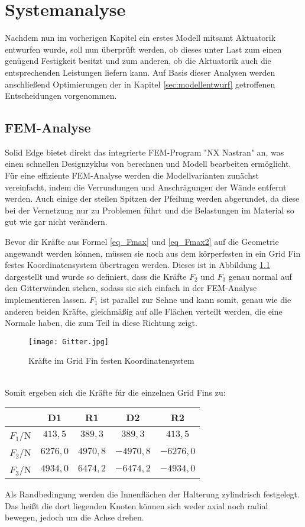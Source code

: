 \chapter{Systemanalyse}\label{sec:simulation}
Nachdem nun im vorherigen Kapitel ein erstes Modell mitsamt Aktuatorik entwurfen wurde, soll nun überprüft werden, ob dieses unter Last zum einen genügend Festigkeit besitzt und zum anderen, ob die Aktuatorik auch die entsprechenden Leistungen liefern kann. Auf Basis dieser Analysen werden anschließend Optimierungen der in Kapitel \ref{sec:modellentwurf} getroffenen Entscheidungen vorgenommen.


\section{FEM-Analyse}
Solid Edge bietet direkt das integrierte FEM-Program "NX Nastran" an, was einen schnellen Designzyklus von berechnen und Modell bearbeiten ermöglicht. Für eine effiziente FEM-Analyse werden die Modellvarianten zunächst vereinfacht, indem die Verrundungen und Anschrägungen der Wände entfernt werden. Auch einige der steilen Spitzen der Pfeilung werden abgerundet, da diese bei der Vernetzung nur zu Problemen führt und die Belastungen im Material so gut wie gar nicht verändern.

Bevor dir Kräfte aus Formel \ref{eq_Fmax} und \ref{eq_Fmax2} auf die Geometrie angewandt werden können, müssen sie noch aus dem körperfesten in ein Grid Fin festes Koordinatensystem übertragen werden. Dieses ist in Abbildung \ref{abb_gitter} dargestellt und wurde so definiert, dass die Kräfte $F_2$ und $F_3$ genau normal auf den Gitterwänden stehen, sodass sie sich einfach in der FEM-Analyse implementieren lassen. $F_1$ ist parallel zur Sehne und kann somit, genau wie die anderen beiden Kräfte, gleichmäßig auf alle Flächen verteilt werden, die eine Normale haben, die zum Teil in diese Richtung zeigt.
\begin{figure}[h] 
	\centering
	\texttt{[image: Gitter.jpg]}
	\caption{Kräfte im Grid Fin festen Koordinatensystem}
	\label{abb_gitter}
\end{figure}\\
Somit ergeben sich die Kräfte für die einzelnen Grid Fins zu:
\begin{table}[h]
	\centering
	\begin{tabular}{c||c|c|c|c}
		&D1&R1&D2&R2\\
		\hline
		$F_1/$N&$413,5$&$389,3$&$389,3$&$413,5$\\
		$F_2/$N&$6276,0$&$4970,8$&$-4970,8$&$-6276,0$\\
		$F_3/$N&$4934,0$&$6474,2$&$-6474,2$&$-4934,0$\\
	\end{tabular}
\end{table}
Als Randbedingung werden die Innenflächen der Halterung zylindrisch festgelegt. Das heißt die dort liegenden Knoten können sich weder axial noch radial bewegen, jedoch um die Achse drehen.
